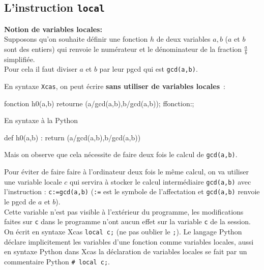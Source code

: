 \documentclass[12pt,a4paper]{book}
\begin{document}
\begin{giacjshere}
\section{L'instruction {\tt local}}
{\bf Notion de variables locales:}\\
Supposons qu'on souhaite d\'efinir une fonction $h$ de deux variables $a,b$
($a$ et $b$ sont des entiers) qui renvoie le num\'erateur et le d\'enominateur 
de la fraction $\frac{a}{b}$ simplifi\'ee.\\
Pour cela il faut diviser $a$ et $b$ par leur pgcd qui est {\tt gcd(a,b)}.

En syntaxe {\tt Xcas}, on peut \'ecrire 
{\bf sans utiliser de variables locales}~:\\
\begin{giaconload}
fonction h0(a,b) 
  retourne (a/gcd(a,b),b/gcd(a,b)); 
ffonction:;
\end{giaconload}
En syntaxe \`a la Python
\begin{giacprog}
def h0(a,b) :
     return (a/gcd(a,b),b/gcd(a,b))
\end{giacprog}
Mais on observe que cela n\'ecessite de faire deux fois le calcul de 
{\tt gcd(a,b)}.

Pour \'eviter de faire faire \`a l'ordinateur deux fois le m\^eme
calcul, on va utiliser une variable locale $c$ qui servira \`a 
stocker le calcul interm\'ediaire {\tt gcd(a,b)} 
avec l'instruction : {\tt c:=gcd(a,b)} ({\tt :=} est le 
symbole de l'affectation et {\tt gcd(a,b)} renvoie le pgcd de $a$ et $b$).\\
Cette variable n'est pas visible \`a l'ext\'erieur du programme, les
modifications faites sur {\tt c} dans le programme n'ont aucun effet
sur la variable {\tt c} de la session.\\
On \'ecrit en syntaxe Xcas {\tt local c;} (ne pas oublier le 
{\tt ;}). Le langage Python d\'eclare implicitement les variables
d'une fonction comme variables locales, aussi en syntaxe Python dans
Xcas la d\'eclaration de variables locales se fait par
un commentaire Python {\tt \# local c;}.


\end{giacjshere}
\end{document}
